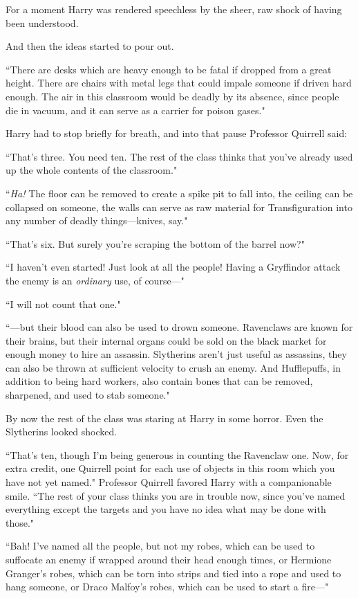 For a moment Harry was rendered speechless by the sheer, raw shock of having been understood.

And then the ideas started to pour out.

``There are desks which are heavy enough to be fatal if dropped from a great height. There are chairs with metal legs that could impale someone if driven hard enough. The air in this classroom would be deadly by its absence, since people die in vacuum, and it can serve as a carrier for poison gases."

Harry had to stop briefly for breath, and into that pause Professor Quirrell said:

``That's three. You need ten. The rest of the class thinks that you've already used up the whole contents of the classroom."

``\emph{Ha!} The floor can be removed to create a spike pit to fall into, the ceiling can be collapsed on someone, the walls can serve as raw material for Transfiguration into any number of deadly things—knives, say."

``That's six. But surely you're scraping the bottom of the barrel now?"

``I haven't even started! Just look at all the people! Having a Gryffindor attack the enemy is an \emph{ordinary} use, of course—"

``I will not count that one."

``—but their blood can also be used to drown someone. Ravenclaws are known for their brains, but their internal organs could be sold on the black market for enough money to hire an assassin. Slytherins aren't just useful as assassins, they can also be thrown at sufficient velocity to crush an enemy. And Hufflepuffs, in addition to being hard workers, also contain bones that can be removed, sharpened, and used to stab someone."

By now the rest of the class was staring at Harry in some horror. Even the Slytherins looked shocked.

``That's ten, though I'm being generous in counting the Ravenclaw one. Now, for extra credit, one Quirrell point for each use of objects in this room which you have not yet named." Professor Quirrell favored Harry with a companionable smile. ``The rest of your class thinks you are in trouble now, since you've named everything except the targets and you have no idea what may be done with those."

``Bah! I've named all the people, but not my robes, which can be used to suffocate an enemy if wrapped around their head enough times, or Hermione Granger's robes, which can be torn into strips and tied into a rope and used to hang someone, or Draco Malfoy's robes, which can be used to start a fire—"

